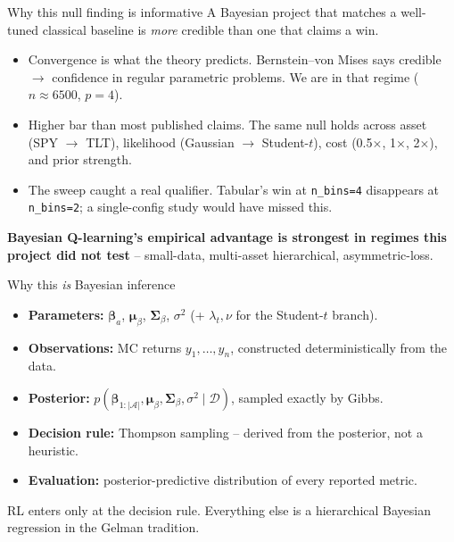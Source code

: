 \documentclass[10pt,aspectratio=169]{beamer}
\newcommand{\D}{\mathcal{D}}
\newcommand{\A}{\mathcal{A}}
\begin{document}
\begin{frame}{Why this null finding is informative}
A Bayesian project that matches a well-tuned classical baseline is
\emph{more} credible than one that claims a win.

\begin{itemize}
  \item \alert{Convergence is what the theory predicts.}
        Bernstein--von Mises says credible $\to$ confidence in regular
        parametric problems. We are in that regime ($n \approx 6500$,
        $p = 4$).
  \item \alert{Higher bar than most published claims.} The same null
        holds across asset (SPY $\to$ TLT), likelihood (Gaussian $\to$
        Student-$t$), cost (0.5$\times$, 1$\times$, 2$\times$), and
        prior strength.
  \item \alert{The sweep caught a real qualifier.} Tabular's win at
        \texttt{n\_bins=4} disappears at \texttt{n\_bins=2}; a
        single-config study would have missed this.
\end{itemize}

\medskip
\textbf{Bayesian Q-learning's empirical advantage is strongest in
regimes this project did not test} -- small-data, multi-asset
hierarchical, asymmetric-loss.
\end{frame}

\begin{frame}{Why this \emph{is} Bayesian inference}
\begin{itemize}
  \item \textbf{Parameters:} $\bm\beta_a$, $\bm\mu_\beta$,
        $\bm\Sigma_\beta$, $\sigma^2$ (+ $\lambda_t, \nu$ for the
        Student-$t$ branch).
  \item \textbf{Observations:} MC returns $y_1, \dots, y_n$,
        constructed deterministically from the data.
  \item \textbf{Posterior:}
        $p(\bm\beta_{1:|\A|}, \bm\mu_\beta, \bm\Sigma_\beta, \sigma^2
        \mid \D)$, sampled exactly by Gibbs.
  \item \textbf{Decision rule:} Thompson sampling --
        \alert{derived from the posterior}, not a heuristic.
  \item \textbf{Evaluation:} posterior-predictive distribution of every
        reported metric.
\end{itemize}

\medskip
RL enters only at the decision rule. Everything else is a hierarchical
Bayesian regression in the Gelman tradition.
\end{frame}
\end{document}
